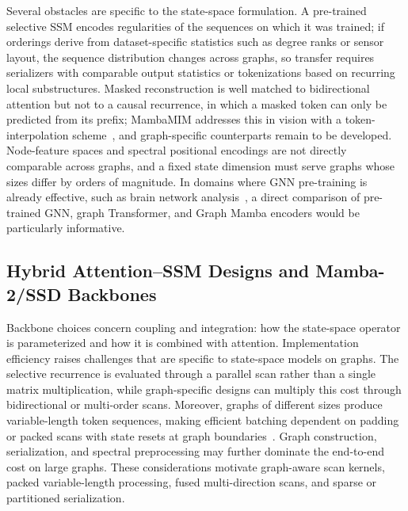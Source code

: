\documentclass[acmsmall]{acmart}
\begin{document}
Several obstacles are specific to the state-space formulation. A pre-trained
selective SSM encodes regularities of the sequences on which it was trained;
if orderings derive from dataset-specific statistics such as degree ranks or
sensor layout, the sequence distribution changes across graphs, so transfer
requires serializers with comparable output statistics or tokenizations based
on recurring local substructures. Masked reconstruction is well matched to
bidirectional attention but not to a causal recurrence, in which a masked
token can only be predicted from its prefix; MambaMIM addresses this in vision
with a token-interpolation scheme~\cite{tang2025mambamim}, and graph-specific
counterparts remain to be developed. Node-feature spaces and spectral
positional encodings are not directly comparable across graphs, and a fixed
state dimension must serve graphs whose sizes differ by orders of magnitude. In domains where GNN pre-training is
already effective, such as brain network analysis~\cite{yang2023ptgb}, a direct
comparison of pre-trained GNN, graph Transformer, and Graph Mamba encoders
would be particularly informative.

\subsection{Hybrid Attention--SSM Designs and Mamba-2/SSD Backbones}
\label{sec:ch-hybrid}

Backbone choices concern coupling and integration: how the state-space operator is parameterized and how it is combined with attention. Implementation efficiency raises challenges that are specific to
state-space models on graphs. The selective recurrence is evaluated through a
parallel scan rather than a single matrix multiplication, while graph-specific
designs can multiply this cost through bidirectional or multi-order scans.
Moreover, graphs of different sizes produce variable-length token sequences,
making efficient batching dependent on padding or packed scans with state resets
at graph boundaries~\cite{xu2024packmamba}. Graph construction, serialization, and
spectral preprocessing may further dominate the end-to-end cost on large
graphs. These considerations motivate graph-aware scan kernels, packed
variable-length processing, fused multi-direction scans, and sparse or
partitioned serialization.
\end{document}
